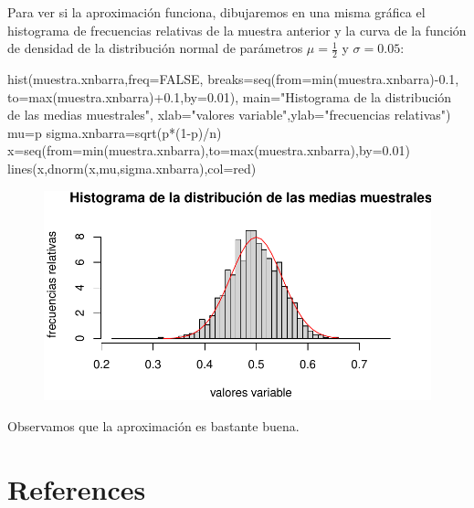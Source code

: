 \documentclass[
  letterpaper,
  DIV=11,
  numbers=noendperiod]{scrreprt}
\newenvironment{Shaded}{\begin{snugshade}}{\end{snugshade}}
\newcommand{\AttributeTok}[1]{\textcolor[rgb]{0.40,0.45,0.13}{#1}}
\newcommand{\ConstantTok}[1]{\textcolor[rgb]{0.56,0.35,0.01}{#1}}
\newcommand{\DecValTok}[1]{\textcolor[rgb]{0.68,0.00,0.00}{#1}}
\newcommand{\FloatTok}[1]{\textcolor[rgb]{0.68,0.00,0.00}{#1}}
\newcommand{\FunctionTok}[1]{\textcolor[rgb]{0.28,0.35,0.67}{#1}}
\newcommand{\NormalTok}[1]{\textcolor[rgb]{0.00,0.23,0.31}{#1}}
\newcommand{\OtherTok}[1]{\textcolor[rgb]{0.00,0.23,0.31}{#1}}
\newcommand{\SpecialCharTok}[1]{\textcolor[rgb]{0.37,0.37,0.37}{#1}}
\newcommand{\StringTok}[1]{\textcolor[rgb]{0.13,0.47,0.30}{#1}}
\newlength{\cslhangindent}
\newlength{\cslentryspacingunit} %
\newenvironment{CSLReferences}[2] %
 {%
  \setlength{\parindent}{0pt}
  \ifodd #1
  \let\oldpar\par
  \def\par{\hangindent=\cslhangindent\oldpar}
  \fi
  \setlength{\parskip}{#2\cslentryspacingunit}
 }%
 {}
\begin{document}
Para ver si la aproximación funciona, dibujaremos en una misma gráfica
el histograma de frecuencias relativas de la muestra anterior y la curva
de la función de densidad de la distribución normal de parámetros
\(\mu =\frac{1}{2}\) y \(\sigma = 0.05\):

\begin{Shaded}
\begin{Highlighting}[]
\FunctionTok{hist}\NormalTok{(muestra.xnbarra,}\AttributeTok{freq=}\ConstantTok{FALSE}\NormalTok{,}
     \AttributeTok{breaks=}\FunctionTok{seq}\NormalTok{(}\AttributeTok{from=}\FunctionTok{min}\NormalTok{(muestra.xnbarra)}\SpecialCharTok{{-}}\FloatTok{0.1}\NormalTok{,}
                \AttributeTok{to=}\FunctionTok{max}\NormalTok{(muestra.xnbarra)}\SpecialCharTok{+}\FloatTok{0.1}\NormalTok{,}\AttributeTok{by=}\FloatTok{0.01}\NormalTok{),}
     \AttributeTok{main=}\StringTok{"Histograma de la distribución de las medias muestrales"}\NormalTok{,}
     \AttributeTok{xlab=}\StringTok{"valores variable"}\NormalTok{,}\AttributeTok{ylab=}\StringTok{"frecuencias relativas"}\NormalTok{)}
\NormalTok{mu}\OtherTok{=}\NormalTok{p}
\NormalTok{sigma.xnbarra}\OtherTok{=}\FunctionTok{sqrt}\NormalTok{(p}\SpecialCharTok{*}\NormalTok{(}\DecValTok{1}\SpecialCharTok{{-}}\NormalTok{p)}\SpecialCharTok{/}\NormalTok{n)}
\NormalTok{x}\OtherTok{=}\FunctionTok{seq}\NormalTok{(}\AttributeTok{from=}\FunctionTok{min}\NormalTok{(muestra.xnbarra),}\AttributeTok{to=}\FunctionTok{max}\NormalTok{(muestra.xnbarra),}\AttributeTok{by=}\FloatTok{0.01}\NormalTok{)}
\FunctionTok{lines}\NormalTok{(x,}\FunctionTok{dnorm}\NormalTok{(x,mu,sigma.xnbarra),}\AttributeTok{col=}\StringTok{\textquotesingle{}red\textquotesingle{}}\NormalTok{)}
\end{Highlighting}
\end{Shaded}

\begin{figure}[H]

{\centering \includegraphics{7_files/figure-pdf/unnamed-chunk-12-1.pdf}

}

\end{figure}

Observamos que la aproximación es bastante buena.


\hypertarget{references}{%
\chapter*{References}\label{references}}


\hypertarget{refs}{}
\begin{CSLReferences}{0}{0}
\end{CSLReferences}
\end{document}
